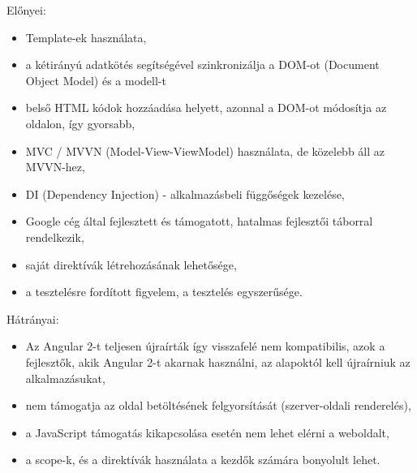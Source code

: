 
Előnyei:


\begin{itemize}
\item Template-ek használata, 
\item a kétirányú adatkötés segítségével szinkronizálja a DOM-ot (Document Object Model) és a modell-t
\item belső HTML kódok hozzáadása helyett, azonnal a DOM-ot módosítja az oldalon, így gyorsabb, 
\item MVC / MVVN (Model-View-ViewModel) használata, de közelebb áll az MVVN-hez,
\item DI (Dependency Injection) - alkalmazásbeli függőségek kezelése,
\item Google cég által fejlesztett és támogatott, hatalmas fejlesztői táborral rendelkezik,
\item saját direktívák létrehozásának lehetősége,
\item a tesztelésre fordított figyelem, a tesztelés egyszerűsége.
\end{itemize}

Hátrányai: 


\begin{itemize}
\item Az Angular 2-t teljesen újraírták így visszafelé nem kompatibilis, azok a fejlesztők, akik Angular 2-t akarnak használni, az alapoktól kell újraírniuk az alkalmazásukat,
\item nem támogatja az oldal betöltésének felgyorsítását (szerver-oldali renderelés),
\item a JavaScript támogatás kikapcsolása esetén nem lehet elérni a weboldalt,
\item a scope-k, és a direktívák használata a kezdők számára bonyolult lehet. \cite{AngularJS}
\end{itemize}


